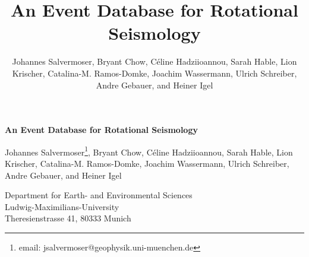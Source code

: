 \documentclass[12pt,reqno]{article} %
\begin{document}
% 

\title{An Event Database for Rotational Seismology}

\author{Johannes Salvermoser, Bryant Chow, C\'{e}line Hadziioannou, Sarah Hable, Lion Krischer, Catalina-M. Ramos-Domke, Joachim Wassermann, Ulrich Schreiber, Andre Gebauer, and Heiner Igel}

% 
% 
% 
% 

\begin{center}

\textbf{An Event Database for Rotational Seismology}

\vspace{6em}
Johannes Salvermoser\footnote{email: jsalvermoser@geophysik.uni-muenchen.de}, Bryant Chow, C\'{e}line Hadziioannou, Sarah Hable, Lion Krischer, Catalina-M. Ramos-Domke, Joachim Wassermann, Ulrich Schreiber, Andre Gebauer, and Heiner Igel
\vspace{3em}

Department for Earth- and Environmental Sciences\\ Ludwig-Maximilians-University\\ Theresienstrasse 41, 80333 Munich



\end{center}
\end{document}
